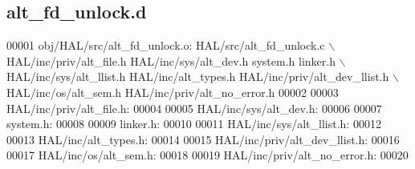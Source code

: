 \subsection{alt\+\_\+fd\+\_\+unlock.\+d}
\label{alt__fd__unlock_8d_source}

\begin{DoxyCode}
00001 obj/HAL/src/alt_fd_unlock.o: HAL/src/alt_fd_unlock.c \(\backslash\)
 HAL/inc/priv/alt\_file.h HAL/inc/sys/alt_dev.h system.h linker.h \(\backslash\)
 HAL/inc/sys/alt_llist.h HAL/inc/alt\_types.h HAL/inc/priv/alt_dev_llist.h \(\backslash\)
 HAL/inc/os/alt\_sem.h HAL/inc/priv/alt_no_error.h
00002 
00003 HAL/inc/priv/alt\_file.h:
00004 
00005 HAL/inc/sys/alt_dev.h:
00006 
00007 system.h:
00008 
00009 linker.h:
00010 
00011 HAL/inc/sys/alt_llist.h:
00012 
00013 HAL/inc/alt\_types.h:
00014 
00015 HAL/inc/priv/alt_dev_llist.h:
00016 
00017 HAL/inc/os/alt\_sem.h:
00018 
00019 HAL/inc/priv/alt_no_error.h:
00020 \end{DoxyCode}
